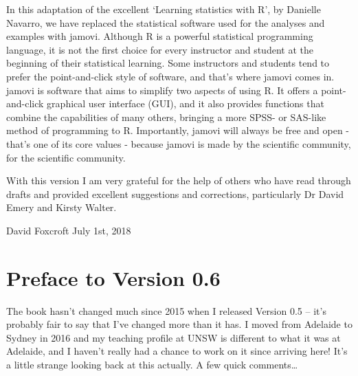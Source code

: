 \documentclass[
]{book}
\begin{document}
In this adaptation of the excellent `Learning statistics with R', by Danielle Navarro, we have replaced the statistical software used for the analyses and examples with jamovi. Although R is a powerful statistical programming language, it is not the first choice for every instructor and student at the beginning of their statistical learning. Some instructors and students tend to prefer the point-and-click style of software, and that's where jamovi comes in. jamovi is software that aims to simplify two aspects of using R. It offers a point-and-click graphical user interface (GUI), and it also provides functions that combine the capabilities of many others, bringing a more SPSS- or SAS-like method of programming to R. Importantly, jamovi will always be free and open - that's one of its core values - because jamovi is made by the scientific community, for the scientific community.

With this version I am very grateful for the help of others who have read through drafts and provided excellent suggestions and corrections, particularly Dr David Emery and Kirsty Walter.

David Foxcroft
July 1st, 2018

\hypertarget{preface-to-version-0.6}{%
\section*{Preface to Version 0.6}\label{preface-to-version-0.6}}

The book hasn't changed much since 2015 when I released Version 0.5 -- it's probably fair to say that I've changed more than it has. I moved from Adelaide to Sydney in 2016 and my teaching profile at UNSW is different to what it was at Adelaide, and I haven't really had a chance to work on it since arriving here! It's a little strange looking back at this actually. A few quick comments\ldots{}
\end{document}
